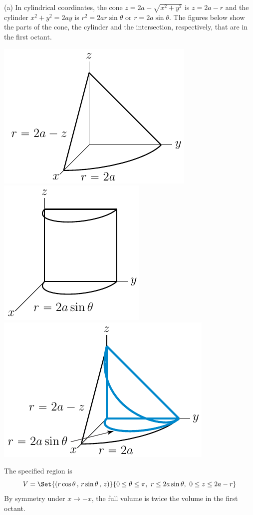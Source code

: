 \begin{solution}
 (a) In cylindrical coordinates, the cone $z=2a-\sqrt{x^2+y^2}$ is $z=2a-r$
and the cylinder $x^2+y^2=2ay$ is $r^2=2ar\sin\theta$ or $r=2a\sin\theta$.
The figures below show the parts of the cone, the cylinder and
the intersection, respectively, that are in the first octant. 
\begin{center}
     \includegraphics[scale=0.9]{fig/domainCylinderConea.pdf}
     \includegraphics[scale=0.9]{fig/domainCylinderConeb.pdf}
     \includegraphics[scale=0.9]{fig/domainCylinderCone.pdf}
\end{center}
The specified region is
\begin{equation*}
V=\Set{(r\cos\theta\,,\,r\sin\theta\,,\,z)}
           {0\le\theta\le\pi,\ r\le 2a\sin\theta,\ 0\le z\le 2a-r}
\end{equation*}
By symmetry under $x\rightarrow -x$, the full volume is twice the
volume in the first octant. 


\end{solution}

